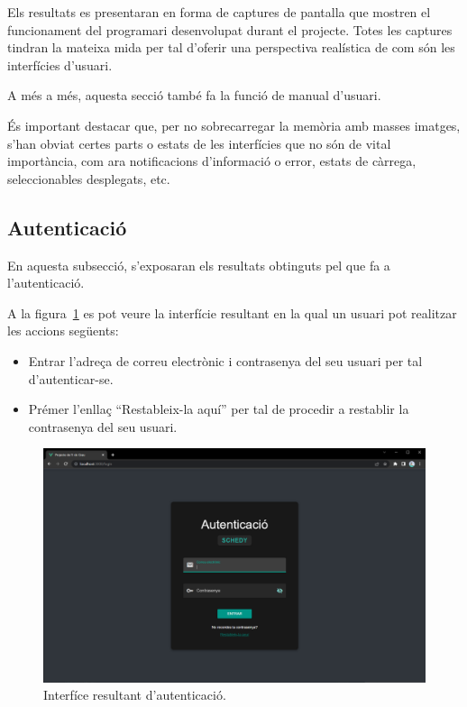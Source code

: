 \documentclass[a4paper,12pt]{ThesisStyle}
\begin{document}
Els resultats es presentaran en forma de captures de pantalla que mostren el funcionament del programari desenvolupat durant el projecte. Totes les captures tindran la mateixa mida per tal d'oferir una perspectiva realística de com són les interfícies d'usuari.

A més a més, aquesta secció també fa la funció de manual d'usuari.

És important destacar que, per no sobrecarregar la memòria amb masses imatges, s'han obviat certes parts o estats de les interfícies que no són de vital importància, com ara notificacions d'informació o error, estats de càrrega, seleccionables desplegats, etc.

\newpage

\subsection{Autenticació}
\label{subsec:resultats_auth}

En aquesta subsecció, s'exposaran els resultats obtinguts pel que fa a l'autenticació.

A la figura~\ref{img:resultats_auth_autenticacio} es pot veure la interfície resultant en la qual un usuari pot realitzar les accions següents:
\begin{itemize}
  \item Entrar l'adreça de correu electrònic i contrasenya del seu usuari per tal d'autenticar-se.
  \item Prémer l'enllaç ``Restableix-la aquí'' per tal de procedir a restablir la contrasenya del seu usuari.
\end{itemize}

\begin{figure}[H]
  \centering
  \includegraphics[width=\textwidth]{assets/results/auth/autenticacio.png}
  \caption{\label{img:resultats_auth_autenticacio}Interfíce resultant d'autenticació.}
\end{figure}
\end{document}
